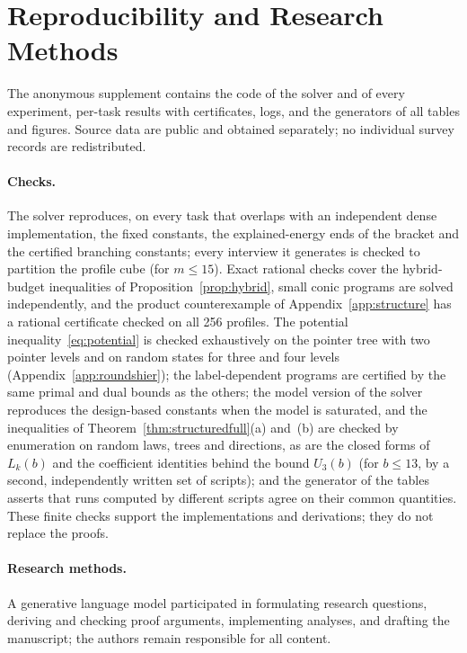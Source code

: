 \section{Reproducibility and Research Methods}\label{app:repro}
The anonymous supplement contains the code of the solver and of every experiment, per-task results with certificates, logs, and the generators of all tables and figures. Source data are public and obtained separately; no individual survey records are redistributed.

\paragraph{Checks.}
The solver reproduces, on every task that overlaps with an independent dense implementation, the fixed constants, the explained-energy ends of the bracket and the certified branching constants; every interview it generates is checked to partition the profile cube (for $m\le15$). Exact rational checks cover the hybrid-budget inequalities of Proposition~\ref{prop:hybrid}, small conic programs are solved independently, and the product counterexample of Appendix~\ref{app:structure} has a rational certificate checked on all 256 profiles. The potential inequality~\eqref{eq:potential} is checked exhaustively on the pointer tree with two pointer levels and on random states for three and four levels (Appendix~\ref{app:roundshier}); the label-dependent programs are certified by the same primal and dual bounds as the others; the model version of the solver reproduces the design-based constants when the model is saturated, and the inequalities of Theorem~\ref{thm:structuredfull}(a) and~(b) are checked by enumeration on random laws, trees and directions, as are the closed forms of $L_k(b)$ and the coefficient identities behind the bound $U_3(b)$ (for $b\le13$, by a second, independently written set of scripts); and the generator of the tables asserts that runs computed by different scripts agree on their common quantities. These finite checks support the implementations and derivations; they do not replace the proofs.

\paragraph{Research methods.}
A generative language model participated in formulating research questions, deriving and checking proof arguments, implementing analyses, and drafting the manuscript; the authors remain responsible for all content.
